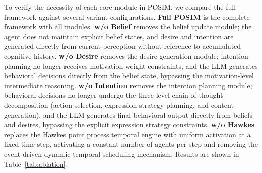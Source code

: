 \documentclass[a4paper,fleqn]{cas-dc}
\begin{document}
To verify the necessity of each core module in POSIM, we compare the full framework against several variant configurations. \textbf{Full POSIM} is the complete framework with all modules. \textbf{w/o Belief} removes the belief update module; the agent does not maintain explicit belief states, and desire and intention are generated directly from current perception without reference to accumulated cognitive history. \textbf{w/o Desire} removes the desire generation module; intention planning no longer receives motivation weight constraints, and the LLM generates behavioral decisions directly from the belief state, bypassing the motivation-level intermediate reasoning. \textbf{w/o Intention} removes the intention planning module; behavioral decisions no longer undergo the three-level chain-of-thought decomposition (action selection, expression strategy planning, and content generation), and the LLM generates final behavioral output directly from beliefs and desires, bypassing the explicit expression strategy constraints. \textbf{w/o Hawkes} replaces the Hawkes point process temporal engine with uniform activation at a fixed time step, activating a constant number of agents per step and removing the event-driven dynamic temporal scheduling mechanism. Results are shown in Table~\ref{tab:ablation}.
\end{document}
